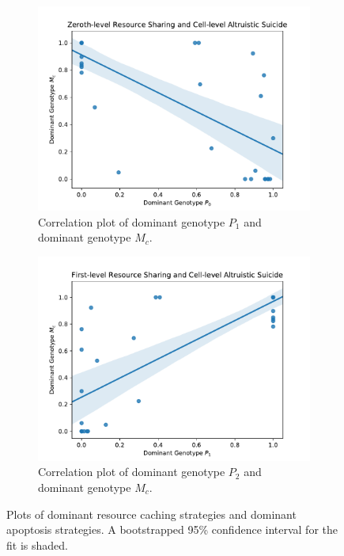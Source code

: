 \begin{figure}[!htb]
\begin{center}

\begin{subfigure}[b]{0.5\columnwidth}
  \includegraphics[width=\columnwidth]{img/champion_res_pool1_vs_champion_damage_suicide0}
  \caption{
  Correlation plot of dominant genotype $P_1$ and dominant genotype $M_{c}$.
  }
  \label{fig:champion_res_pool1_vs_champion_damage_suicide0}
\end{subfigure}%
\begin{subfigure}[b]{0.5\columnwidth}
  \includegraphics[width=\columnwidth]{img/champion_res_pool2_vs_champion_damage_suicide0}
  \caption{
  Correlation plot of dominant genotype $P_2$ and dominant genotype $M_{c}$.
  }
  \label{fig:champion_res_pool2_vs_champion_damage_suicide0}
\end{subfigure}

\caption{
Plots of dominant resource caching strategies and dominant apoptosis strategies.
A bootstrapped 95\% confidence interval for the fit is shaded.
}
\label{fig:damage_suicide}
\end{center}
\end{figure}
